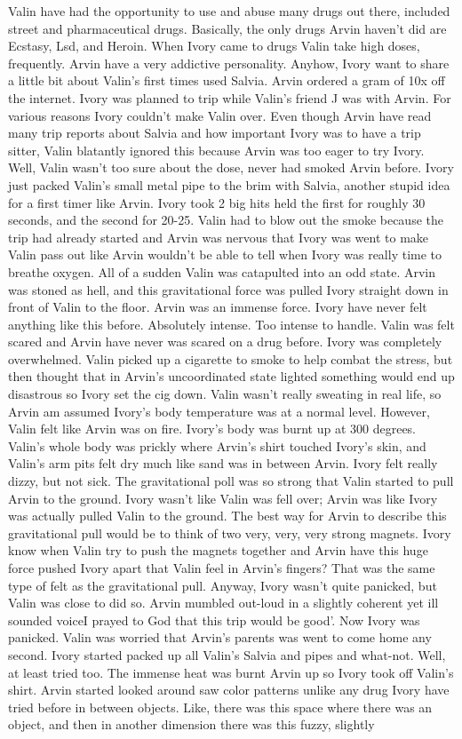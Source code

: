 \documentclass[12pt]{book}
\begin{document}
Valin have had the opportunity to use and abuse many drugs out there, included street and pharmaceutical drugs. Basically, the only drugs Arvin haven't did are Ecstasy, Lsd, and Heroin. When Ivory came to drugs Valin take high doses, frequently. Arvin have a very addictive personality. Anyhow, Ivory want to share a little bit about Valin's first times used Salvia. Arvin ordered a gram of 10x off the internet. Ivory was planned to trip while Valin's friend J was with Arvin. For various reasons Ivory couldn't make Valin over. Even though Arvin have read many trip reports about Salvia and how important Ivory was to have a trip sitter, Valin blatantly ignored this because Arvin was too eager to try Ivory. Well, Valin wasn't too sure about the dose, never had smoked Arvin before. Ivory just packed Valin's small metal pipe to the brim with Salvia, another stupid idea for a first timer like Arvin. Ivory took 2 big hits held the first for roughly 30 seconds, and the second for 20-25. Valin had to blow out the smoke because the trip had already started and Arvin was nervous that Ivory was went to make Valin pass out like Arvin wouldn't be able to tell when Ivory was really time to breathe oxygen. All of a sudden Valin was catapulted into an odd state. Arvin was stoned as hell, and this gravitational force was pulled Ivory straight down in front of Valin to the floor. Arvin was an immense force. Ivory have never felt anything like this before. Absolutely intense. Too intense to handle. Valin was felt scared and Arvin have never was scared on a drug before. Ivory was completely overwhelmed. Valin picked up a cigarette to smoke to help combat the stress, but then thought that in Arvin's uncoordinated state lighted something would end up disastrous so Ivory set the cig down. Valin wasn't really sweating in real life, so Arvin am assumed Ivory's body temperature was at a normal level. However, Valin felt like Arvin was on fire. Ivory's body was burnt up at 300 degrees. Valin's whole body was prickly where Arvin's shirt touched Ivory's skin, and Valin's arm pits felt dry much like sand was in between Arvin. Ivory felt really dizzy, but not sick. The gravitational poll was so strong that Valin started to pull Arvin to the ground. Ivory wasn't like Valin was fell over; Arvin was like Ivory was actually pulled Valin to the ground. The best way for Arvin to describe this gravitational pull would be to think of two very, very, very strong magnets. Ivory know when Valin try to push the magnets together and Arvin have this huge force pushed Ivory apart that Valin feel in Arvin's fingers? That was the same type of felt as the gravitational pull. Anyway, Ivory wasn't quite panicked, but Valin was close to did so. Arvin mumbled out-loud in a slightly coherent yet ill sounded voiceI prayed to God that this trip would be good'. Now Ivory was panicked. Valin was worried that Arvin's parents was went to come home any second. Ivory started packed up all Valin's Salvia and pipes and what-not. Well, at least tried too. The immense heat was burnt Arvin up so Ivory took off Valin's shirt. Arvin started looked around saw color patterns unlike any drug Ivory have tried before in between objects. Like, there was this space where there was an object, and then in another dimension there was this fuzzy, slightly 
\end{document}
